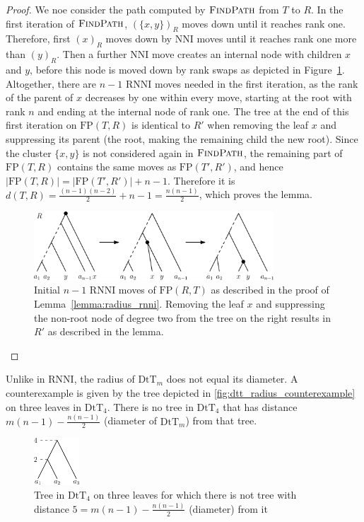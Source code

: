 \documentclass[11pt]{amsart}
\newcommand{\rnni}{\mathrm{RNNI}}
\newcommand{\findpath}{\textsc{FindPath}}
\newcommand{\nni}{\mathrm{NNI}}
\newcommand{\fp}{\mathrm{FP}}
\newcommand{\dtt}{\mathrm{DtT}}
\begin{document}
\begin{proof}
	We noe consider the path computed by $\findpath$ from $T$ to $R$.
	In the first iteration of $\findpath$, $(\{x,y\})_R$ moves down until it reaches rank one.
	Therefore, first $(x)_R$ moves down by $\nni$ moves until it reaches rank one more than $(y)_R$.
	Then a further $\nni$ move creates an internal node with children $x$ and $y$, before this node is moved down by rank swaps as depicted in Figure~\ref{fig:max_dist_ctree}.
	Altogether, there are $n-1$ $\rnni$ moves needed in the first iteration, as the rank of the parent of $x$ decreases by one within every move, starting at the root with rank $n$ and ending at the internal node of rank one.
	The tree at the end of this first iteration on $\fp(T,R)$ is identical to $R'$ when removing the leaf $x$ and suppressing its parent (the root, making the remaining child the new root).
	Since the cluster $\{x,y\}$ is not considered again in $\findpath$, the remaining part of $\fp(T,R)$ contains the same moves as $\fp(T',R')$, and hence $|\fp(T,R)| = |\fp(T',R')| + n-1$.
	Therefore it is $d(T,R) = \frac{(n-1)(n-2)}{2} + n-1 = \frac{n(n-1)}{2}$, which proves the lemma.
	\begin{figure}[ht]
		\includegraphics[width=0.8\textwidth]{max_dist_ctree.eps}
		\caption{Initial $n - 1$ $\rnni$ moves of $\fp(R,T)$ as described in the proof of Lemma~\ref{lemma:radius_rnni}.
		Removing the leaf $x$ and suppressing the non-root node of degree two from the tree on the right results in $R'$ as described in the lemma.}
		\label{fig:max_dist_ctree}
	\end{figure}
\end{proof}

Unlike in $\rnni$, the radius of $\dtt_m$ does not equal its diameter.
A counterexample is given by the tree depicted in \autoref{fig:dtt_radius_counterexample} on three leaves in $\dtt_4$.
There is no tree in $\dtt_4$ that has distance $m(n-1) - \frac{n(n-1)}{2}$ (diameter of $\dtt_m$) from that tree.

\begin{figure}[ht]
	\includegraphics[width=0.15\textwidth]{dtt_radius_counterexample.eps}
	\caption{Tree in $\dtt_4$ on three leaves for which there is not tree with distance $5 = m(n-1) - \frac{n(n-1)}{2}$ (diameter) from it}
	\label{fig:dtt_radius_counterexample}
\end{figure}
\end{document}
